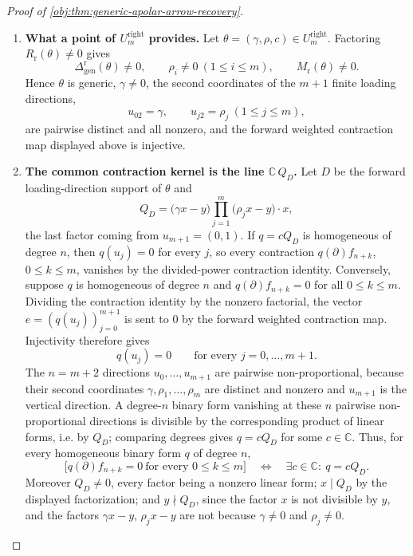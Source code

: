 \begin{proof}[Proof of \cref{obj:thm:generic-apolar-arrow-recovery}]
\begin{enumerate}
\item \textbf{What a point of \(U^{\mathrm{right}}_m\) provides.}  Let \(\theta=(\gamma,\rho,c)\in U^{\mathrm{right}}_m\).  Factoring \(R_{\mathrm r}(\theta)\ne0\) gives
\[
\Delta_{\mathrm{gen}}^{\mathrm r}(\theta)\ne0,
\qquad \rho_i\ne0\ (1\le i\le m),
\qquad M_{\mathrm r}(\theta)\ne0 .
\]
Hence \(\theta\) is generic, \(\gamma\ne0\), the second coordinates of the \(m+1\) finite loading directions,
\[
u_{02}=\gamma,
\qquad
u_{j2}=\rho_j\ (1\le j\le m),
\]
are pairwise distinct and all nonzero, and the forward weighted contraction map displayed above is injective.

\item \textbf{The common contraction kernel is the line \(\mathbb C\,Q_D\).}  Let \(D\) be the forward loading-direction support of \(\theta\) and
\[
Q_D=\bigl(\gamma x-y\bigr)\prod_{j=1}^{m}\bigl(\rho_jx-y\bigr)\cdot x,
\]
the last factor coming from \(u_{m+1}=(0,1)\).  If \(q=cQ_D\) is homogeneous of degree \(n\), then \(q(u_j)=0\) for every \(j\), so every contraction \(q(\partial)f_{n+k}\), \(0\le k\le m\), vanishes by the divided-power contraction identity.  Conversely, suppose \(q\) is homogeneous of degree \(n\) and \(q(\partial)f_{n+k}=0\) for all \(0\le k\le m\).  Dividing the contraction identity by the nonzero factorial, the vector \(e=(q(u_j))_{j=0}^{m+1}\) is sent to \(0\) by the forward weighted contraction map.  Injectivity therefore gives
\[
q(u_j)=0\qquad\text{for every }j=0,\ldots,m+1 .
\]
The \(n=m+2\) directions \(u_0,\ldots,u_{m+1}\) are pairwise non-proportional, because their second coordinates \(\gamma,\rho_1,\ldots,\rho_m\) are distinct and nonzero and \(u_{m+1}\) is the vertical direction.  A degree-\(n\) binary form vanishing at these \(n\) pairwise non-proportional directions is divisible by the corresponding product of linear forms, i.e. by \(Q_D\); comparing degrees gives \(q=cQ_D\) for some \(c\in\mathbb C\).  Thus, for every homogeneous binary form \(q\) of degree \(n\),
\[
\bigl[q(\partial)f_{n+k}=0\ \text{for every }0\le k\le m\bigr]
\quad\Longleftrightarrow\quad
\exists c\in\mathbb C:\ q=cQ_D .
\]
Moreover \(Q_D\ne0\), every factor being a nonzero linear form; \(x\mid Q_D\) by the displayed factorization; and \(y\nmid Q_D\), since the factor \(x\) is not divisible by \(y\), and the factors \(\gamma x-y\), \(\rho_jx-y\) are not because \(\gamma\ne0\) and \(\rho_j\ne0\).


\end{enumerate}
\end{proof}
